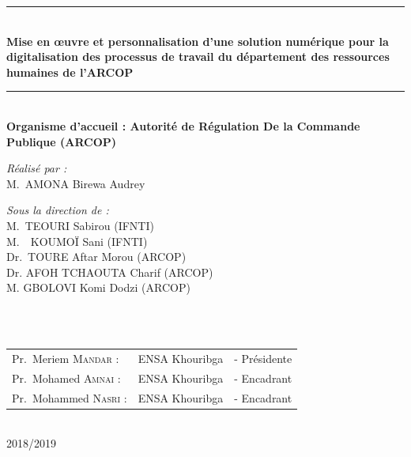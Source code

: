 \begin{titlepage}
\begin{center}
\rule{\linewidth}{0.3mm} \\[0.4cm]
{ \huge \bfseries\color{blue!70!black} Mise en œuvre et personnalisation d'une solution numérique pour la digitalisation des processus de travail du département des ressources humaines de l'ARCOP \\[0.4cm] }
\rule{\linewidth}{0.3mm} \\[1cm]
{\large \bfseries Organisme d'accueil : Autorité de Régulation De la Commande Publique (ARCOP) }\\[1cm]
\noindent
\begin{minipage}{0.4\textwidth}
  \begin{flushleft} \large
    \emph{\color{orange!80!black}Réalisé par :}\\
    M.~\textsc{AMONA} Birewa Audrey \\
  \end{flushleft}
\end{minipage}%
\begin{minipage}{0.5\textwidth}
  \begin{flushright} \large
    \emph{\color{orange!80!black}Sous la direction de :} \\
    M.~\textsc{TEOURI} Sabirou  (IFNTI)\\
    M.~~\textsc{KOUMOÏ} Sani  (IFNTI)\\
    Dr.~\textsc{TOURE} Aftar Morou (ARCOP)\\
    Dr. \textsc{AFOH TCHAOUTA} Charif (ARCOP)\\
    M. \textsc{GBOLOVI} Komi Dodzi (ARCOP)\\
  \end{flushright}
\end{minipage}\\[1cm]

\\[0.5cm]

\color{black}
\centering
\begin{tabular}{lll}
\large Pr.~Meriem \textsc{Mandar} : & \large ENSA Khouribga & \large - Présidente \\[0.1cm]
\large Pr.~Mohamed \textsc{Amnai} : & \large ENSA Khouribga & \large - Encadrant \\[0.1cm]
\large Pr.~Mohammed \textsc{Nasri} : & \large ENSA Khouribga & \large - Encadrant
\end{tabular}

\vfill

{\large \color{orange!80!black}{Année universitaire}\\ \color{blue!80!black}2018/2019}

\end{center}
\end{titlepage}
